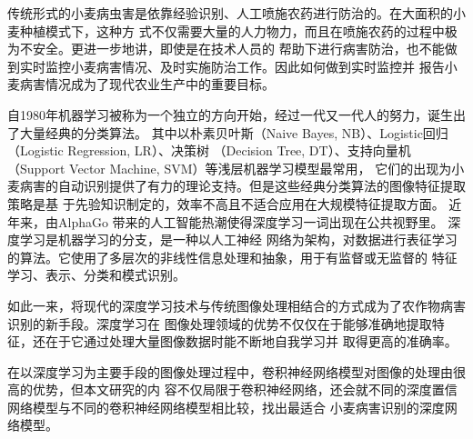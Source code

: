 \documentclass[12pt UTF8]{ctexart}
\begin{document}
  传统形式的小麦病虫害是依靠经验识别、人工喷施农药进行防治的。在大面积的小麦种植模式下，这种方
  式不仅需要大量的人力物力，而且在喷施农药的过程中极为不安全。更进一步地讲，即使是在技术人员的
  帮助下进行病害防治，也不能做到实时监控小麦病害情况、及时实施防治工作。因此如何做到实时监控并
  报告小麦病害情况成为了现代农业生产中的重要目标。

  自1980年机器学习被称为一个独立的方向开始，经过一代又一代人的努力，诞生出了大量经典的分类算法。
  其中以朴素贝叶斯（Naive Bayes, NB）、Logistic回归（Logistic Regression, LR）、决策树
  （Decision Tree, DT）、支持向量机（Support Vector Machine, SVM）等浅层机器学习模型最常用，
  它们的出现为小麦病害的自动识别提供了有力的理论支持。但是这些经典分类算法的图像特征提取策略是基
  于先验知识制定的，效率不高且不适合应用在大规模特征提取方面\cite{article1}。 近年来，由AlphaGo
  带来的人工智能热潮使得深度学习一词出现在公共视野里。 深度学习是机器学习的分支，是一种以人工神经
  网络为架构，对数据进行表征学习的算法。它使用了多层次的非线性信息处理和抽象，用于有监督或无监督的
  特征学习、表示、分类和模式识别。

  如此一来，将现代的深度学习技术与传统图像处理相结合的方式成为了农作物病害识别的新手段。深度学习在
  图像处理领域的优势不仅仅在于能够准确地提取特征，还在于它通过处理大量图像数据时能不断地自我学习并
  取得更高的准确率。

  在以深度学习为主要手段的图像处理过程中，卷积神经网络模型对图像的处理由很高的优势，但本文研究的内
  容不仅局限于卷积神经网络，还会就不同的深度置信网络模型与不同的卷积神经网络模型相比较，找出最适合
  小麦病害识别的深度网络模型。

  

  \newpage
  
  
\end{document}
